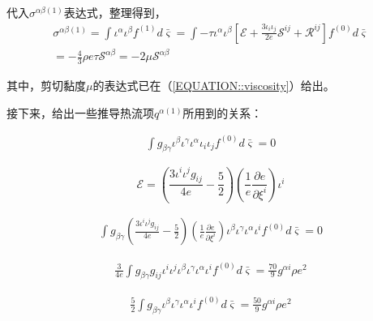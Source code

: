 \documentclass[MathematicsNumericsDerivationsAndOpenFOAM.tex]{subfiles}
\begin{document}
代入$\sigma^{\alpha\beta(1)}$表达式，整理得到，
\begin{equation}
  \begin{gathered}
    \sigma^{\alpha\beta(1)}=\int \iota^{\alpha} \iota^{\beta} f^{(1)}  d \bar{\varsigma}= \int  -\tau \iota^\alpha \iota^\beta [ \mathcal{E}
      +\frac{3\iota_i \iota_j}{2e} \mathcal{S}^{ij}
      +  \mathcal{R}^{ij}
    ]{f^{(0)}} d \bar{\varsigma} \\
    = - \frac{4}{3} \rho e \tau  \mathcal{S}^{\alpha\beta} =  -2 \mu \mathcal{S}^{\alpha\beta}
  \end{gathered}
\end{equation}

其中，剪切黏度$\mu$的表达式已在（\ref{EQUATION::viscosity}）给出。


接下来，给出一些推导热流项$q^{\alpha (1)}$所用到的关系：

\begin{equation}
  \begin{gathered}
    \int g_{\beta\gamma} \iota^{\beta} \iota^{\gamma}  \iota^{\alpha} \iota_i \iota_j  f^{(0)}  d \bar{\varsigma} =0
  \end{gathered}
\end{equation}


$$
  \mathcal{E}= (\frac{3 {\iota^i\iota^jg_{ij}}}{4e}-\frac{5}{2}) (\frac{1}{e}\frac{\partial e}{\partial \xi^i})\iota^i
$$



\begin{equation}
  \begin{gathered}
    \int g_{\beta\gamma} (\frac{3 {\iota^i\iota^jg_{ij}}}{4e}-\frac{5}{2}) (\frac{1}{e}\frac{\partial e}{\partial \xi^i})\iota^{\beta} \iota^{\gamma}  \iota^{\alpha} \iota^i   f^{(0)}  d \bar{\varsigma} =0
  \end{gathered}
\end{equation}



\begin{equation}
  \begin{gathered}
    \frac{3}{4e}\int g_{\beta\gamma} g_{ij} \iota^i\iota^j\iota^{\beta} \iota^{\gamma}  \iota^{\alpha} \iota^i   f^{(0)}  d \bar{\varsigma} =\frac{70}{9}g^{\alpha i}\rho e^2
  \end{gathered}
\end{equation}


\begin{equation}
  \begin{gathered}
    \frac{5}{2} \int g_{\beta\gamma} \iota^{\beta} \iota^{\gamma}  \iota^{\alpha} \iota^i   f^{(0)}  d \bar{\varsigma} =\frac{50}{9}g^{\alpha i}\rho e^2
  \end{gathered}
\end{equation}
\end{document}
